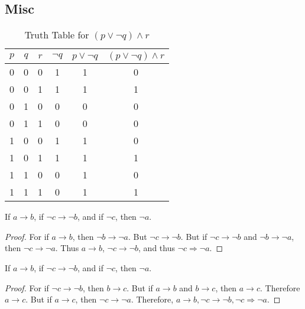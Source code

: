     \subsection{Misc}
        \begin{table}[H]
            \centering
            \captionsetup{type=table}
            \begin{tabular}{c c c c c c}
                \hline
                $p$&$q$&$r$&$\neg{q}$&$p\lor\neg{q}$&$(p\lor\neg{q})\land{r}$\\
                \hline
                0&0&0&1&1&0\\
                0&0&1&1&1&1\\
                0&1&0&0&0&0\\
                0&1&1&0&0&0\\
                1&0&0&1&1&0\\
                1&0&1&1&1&1\\
                1&1&0&0&1&0\\
                1&1&1&0&1&1\\
                \hline
            \end{tabular}
            \caption{Truth Table for $(p\lor\neg{q})\land{r}$}
            \label{tab:Truth_Table_Example}
        \end{table}
        \begin{theorem}
            If $a\rightarrow{b}$, if $\neg{c}\rightarrow\neg{b}$, and if
            $\neg{c}$, then $\neg{a}$.
        \end{theorem}
        \begin{proof}
            For if $a\rightarrow{b}$, then $\neg{b}\rightarrow\neg{a}$. But
            $\neg{c}\rightarrow\neg{b}$. But if $\neg{c}\rightarrow\neg{b}$ and
            $\neg{b}\rightarrow\neg{a}$, then $\neg{c}\rightarrow\neg{a}$. Thus
            $a\rightarrow{b}$, $\neg{c}\rightarrow\neg{b}$, and thus
            $\neg{c}\Rightarrow\neg{a}$.
        \end{proof}
        \begin{problem}
            If $a\rightarrow{b}$, if $\neg{c}\rightarrow\neg{b}$, and if
            $\neg{c}$, then $\neg{a}$.
        \end{problem}
        \begin{proof}
            For if $\neg c \rightarrow \neg b$, then $b\rightarrow c$. But if
            $a\rightarrow b$ and $b\rightarrow c$, then $a\rightarrow c$.
            Therefore $a\rightarrow c$. But if $a\rightarrow c$, then
            $\neg c \rightarrow \neg a$. Therefore,
            $a\rightarrow b, \neg c \rightarrow \neg b, \neg c \Rightarrow \neg a$.
        \end{proof}